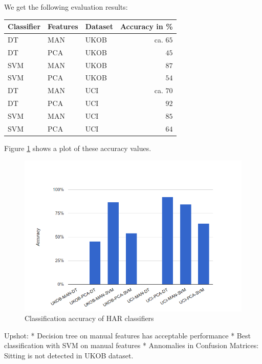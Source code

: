 We get the following evaluation results:
\begin{center}
\begin{tabular}{|lll|r|} \hline
  {\bf Classifier} & {\bf Features} & {\bf Dataset} & {\bf Accuracy in \%} \\ \hline
  DT	& MAN	& UKOB	&ca.	$65$ \\ 
  DT	& PCA	& UKOB	&	$45$\\ 
  SVM	& MAN	& UKOB	&	$87$\\ 
  SVM	& PCA	& UKOB	&	$54$\\
  DT	& MAN	& UCI	&ca.	$70$ \\ 
  DT	& PCA	& UCI	&	$92$ \\ 
  SVM	& MAN	& UCI	&	$85$ \\ 
  SVM	& PCA	& UCI	&	$64$ \\ \hline
\end{tabular}
\end{center}

Figure \ref{fig:har_eval} shows a plot of these accuracy values.

\begin{figure}[ht]
  \centering
  \includegraphics[width= 0.5 \textwidth]{img/har/accuracy_plot.png}
  \caption{Classification accuracy of HAR classifiers}
  \label{fig:har_eval}
\end{figure}


Upshot:
* Decision tree on manual features has acceptable performance
* Best classification with SVM on manual features
* Annomalies in Confusion Matrices: Sitting is not detected in UKOB dataset.

